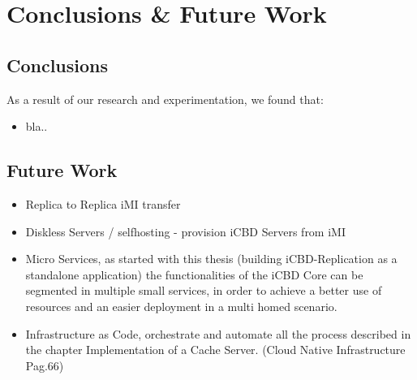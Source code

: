 \chapter{Conclusions \& Future Work}
\label{cha:conclusion}

\section{Conclusions}
\label{sec:conclusions}

As a result of our research and experimentation, we found that:

\begin{itemize}
	\item bla..
\end{itemize}

\section{Future Work}
\label{sec:future_work}

\begin{itemize}
	\item Replica to Replica iMI transfer
	\item Diskless Servers / selfhosting - provision iCBD Servers from iMI
	\item Micro Services, as started with this thesis (building iCBD-Replication as a standalone application) the functionalities of the iCBD Core can be segmented in multiple small services, in order to achieve a better use of resources and an easier deployment in a multi homed scenario.
	\item Infrastructure as Code, orchestrate and automate all the process described in the chapter Implementation of a Cache Server. (Cloud Native Infrastructure Pag.66)
\end{itemize}




